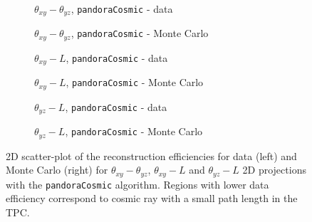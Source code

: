 \documentclass[a4paper]{scrartcl}
\begin{document}
\begin{figure}[htbp]
\begin{subfigure}{0.52\textwidth}
\caption{$\theta_{xy} - \theta_{yz}$, \texttt{pan\-do\-ra\-Co\-smic} - data} \label{fig:2d_pc1}
\end{subfigure}
\begin{subfigure}{0.52\textwidth}
\caption{$\theta_{xy} - \theta_{yz}$, \texttt{pan\-do\-ra\-Co\-smic} - Monte Carlo}\label{fig:2d_pc1_mc}
\end{subfigure}
\begin{subfigure}{0.52\textwidth}
\caption{$\theta_{xy} - L$, \texttt{pan\-do\-ra\-Co\-smic} - data}\label{fig:2d_pc2}
\end{subfigure}
\begin{subfigure}{0.52\textwidth}
\caption{$\theta_{xy} - L$, \texttt{pan\-do\-ra\-Co\-smic} - Monte Carlo}\label{fig:2d_pc2_mc}
\end{subfigure}
\begin{subfigure}{0.52\textwidth}
\caption{$\theta_{yz} - L$, \texttt{pan\-do\-ra\-Co\-smic} - data}\label{fig:2d_pc3}
\end{subfigure}
\begin{subfigure}{0.52\textwidth}
\caption{$\theta_{yz} - L$, \texttt{pan\-do\-ra\-Co\-smic} - Monte Carlo}\label{fig:2d_pc3_mc}
\end{subfigure}
\caption{2D scatter-plot of the reconstruction efficiencies for data (left) and Monte Carlo (right) for $\theta_{xy} - \theta_{yz}$, $\theta_{xy} - L$ and $\theta_{yz} - L$ 2D projections with the \texttt{pandoraCosmic} algorithm. Regions with lower data efficiency correspond to cosmic ray with a small path length in the TPC.} \label{fig:2deff_pandora}
\end{figure}
\end{document}
